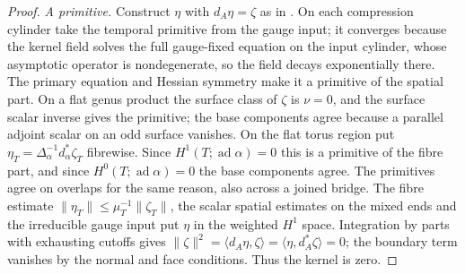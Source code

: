 \documentclass[11pt]{amsart}
\theoremstyle{definition}
\theoremstyle{remark}
\theoremstyle{plain}
\numberwithin{equation}{section}
\newcommand{\ad}{\operatorname{ad}}
\begin{document}
\begin{proof}
\emph{A primitive.} Construct $\eta$ with $d_A\eta=\zeta$ as in
\cite[Proposition~4.54]{DFL}. On each compression cylinder take the
temporal primitive from the gauge input; it converges because the
kernel field solves the full gauge-fixed equation on the input
cylinder, whose asymptotic operator is nondegenerate, so the field
decays exponentially there. The primary equation and Hessian symmetry
make it a primitive of the spatial part. On a flat genus product the
surface class of $\zeta$ is $\nu=0$, and the surface scalar inverse
gives the primitive; the base components agree because a parallel
adjoint scalar on an odd surface vanishes. On the flat torus region put
$\eta_T=\Delta_\alpha^{-1}d_\alpha^*\zeta_T$ fibrewise. Since
$H^1(T;\ad\alpha)=0$ this is a primitive of the fibre part, and since
$H^0(T;\ad\alpha)=0$ the base components agree. The primitives agree on
overlaps for the same reason, also across a joined bridge. The fibre
estimate $\|\eta_T\|\le\mu_T^{-1}\|\zeta_T\|$, the scalar spatial
estimates on the mixed ends and the irreducible gauge input put $\eta$
in the weighted $H^1$ space. Integration by parts with exhausting cutoffs
gives
$\|\zeta\|^2=\langle d_A\eta,\zeta\rangle=\langle\eta,d_A^*\zeta\rangle=0$;
the boundary term vanishes by the normal and face conditions. Thus the
kernel is zero.


\end{proof}
\end{document}
